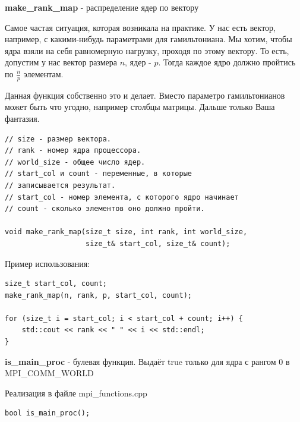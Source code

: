 \documentclass[12pt,fleqn]{article}
\begin{document}
        \begin{center}
        \textbf{make\_rank\_map} - распределение ядер по вектору
        \end{center}

        Самое частая ситуация, которая возникала на практике. У нас есть вектор, например, с какими-нибудь параметрами для гамильтониана. Мы хотим, чтобы ядра взяли на себя равномерную нагрузку, 
        проходя по этому вектору. То есть, допустим у нас вектор размера $n$, ядер - $p$. Тогда каждое ядро должно пройтись по $\frac{n}{p}$ элементам.

        Данная функция собственно это и делает. Вместо параметро гамильтонианов может быть что угодно, например столбцы матрицы. Дальше только Ваша фантазия.
\begin{mdframed}[linecolor=black, topline=true, bottomline=true,
    leftline=false, rightline=false]
\begin{verbatim}
// size - размер вектора. 
// rank - номер ядра процессора. 
// world_size - общее число ядер.
// start_col и count - переменные, в которые 
// записывается результат. 
// start_col - номер элемента, с которого ядро начинает
// count - сколько элементов оно должно пройти.

void make_rank_map(size_t size, int rank, int world_size, 
                   size_t& start_col, size_t& count);
    \end{verbatim}
\end{mdframed}

Пример использования:

\begin{mdframed}[linecolor=black, topline=true, bottomline=true,
    leftline=false, rightline=false]
\begin{verbatim}
size_t start_col, count;
make_rank_map(n, rank, p, start_col, count);

for (size_t i = start_col; i < start_col + count; i++) {
    std::cout << rank << " " << i << std::endl;
}
\end{verbatim}
\end{mdframed}

    \begin{center}
        \textbf{is\_main\_proc} - булевая функция. Выдаёт true только для ядра с рангом 0 в MPI\_COMM\_WORLD
    \end{center}

    Реализация в файле \textsf{mpi\_functions.cpp}

\begin{mdframed}[linecolor=black, topline=true, bottomline=true,
    leftline=false, rightline=false]
\begin{verbatim}
bool is_main_proc();
\end{verbatim}
\end{mdframed}
\end{document}
